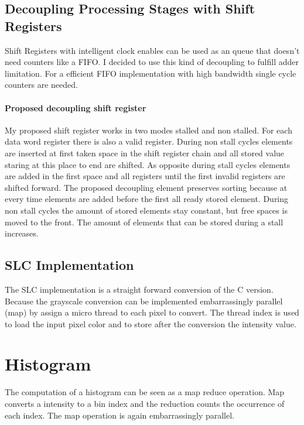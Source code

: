 \documentclass[a4paper]{scrartcl}
\begin{document}
\pagebreak

\subsection{Decoupling Processing Stages with Shift Registers}

Shift Registers with intelligent clock enables can be used as an queue that doesn't need counters like a FIFO. I decided to use this kind of decoupling to fulfill adder limitation. For a efficient FIFO implementation with high bandwidth single cycle counters are needed.

\paragraph{Proposed decoupling shift register}
My proposed shift register works in two modes stalled and non stalled. For each data word register there is also a valid register. During non stall cycles elements are inserted at first taken space in the shift register chain and all stored value staring at this place to end are shifted. As opposite during stall cycles elements are added in the first space and all registers until the first invalid registers are shifted forward. The proposed decoupling element preserves sorting because at every time elements are added before the first all ready stored element. During non stall cycles the amount of stored elements stay constant, but free spaces is moved to the front. The amount of elements that can be stored during a stall increases.

\subsection{SLC Implementation}
The SLC implementation is a straight forward conversion of the C version. Because the grayscale conversion can be implemented embarrassingly parallel (map) by assign a micro thread to each pixel to convert. The thread index is used to load the input pixel color and to store after the conversion the intensity value.

\section{Histogram}
The computation of a histogram can be seen as a map reduce operation. Map converts a intensity to a bin index and the reduction counts the occurrence of each index. The map operation is again embarrassingly parallel. 
\end{document}
